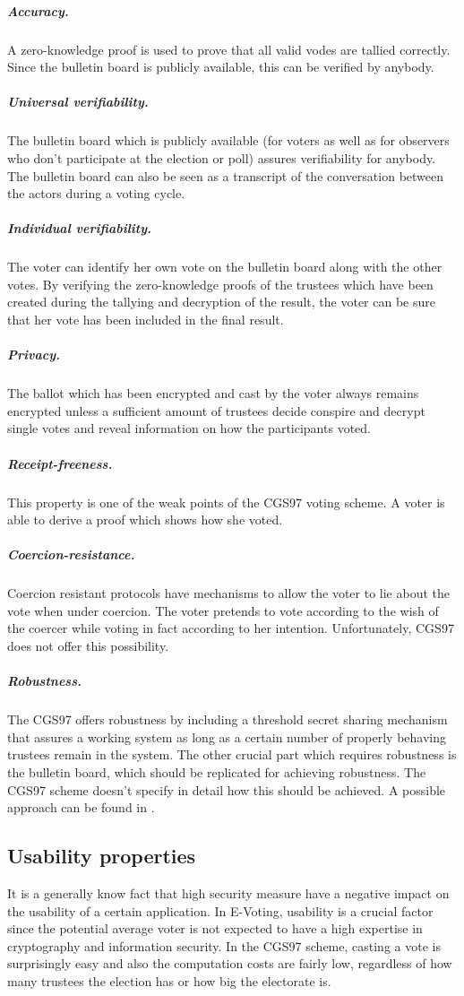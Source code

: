 \documentclass[numbers=noenddot, abstract=on, a4paper, headsepline,
footsepline, oneside, draft=off]{scrreprt}
\begin{document}
\subparagraph{Accuracy.} A zero-knowledge proof is used to prove that all valid
vodes are tallied correctly. Since the bulletin board is publicly available,
this can be verified by anybody.

\subparagraph{Universal verifiability.} The bulletin board which is publicly
available (for voters as well as for observers who don't participate at the
election or poll) assures verifiability for anybody. The bulletin board can also
be seen as a transcript of the conversation between the actors during a voting
cycle. 

\subparagraph{Individual verifiability.} The voter can identify her own vote on
the bulletin board along with the other votes. By verifying the zero-knowledge
proofs of the trustees which have been created during the tallying and
decryption of the result, the voter can be sure that her vote has been included
in the final result.

\subparagraph{Privacy.} The ballot which has been encrypted and cast by the
voter always remains encrypted unless a sufficient amount of trustees decide
conspire and decrypt single votes and reveal information on how the participants
voted.

\subparagraph{Receipt-freeness.} This property is one of the weak points of the
CGS97 voting scheme. A voter is able to derive a proof which shows how she
voted.

\subparagraph{Coercion-resistance.} Coercion resistant protocols have mechanisms
to allow the voter to lie about the vote when under coercion. The voter pretends
to vote according to the wish of the coercer while voting in fact according to
her intention. Unfortunately, CGS97 does not offer this possibility.

\subparagraph{Robustness.} The CGS97 offers robustness by including a
threshold secret sharing mechanism that assures a working system as long as a
certain number of properly behaving trustees remain in the system. The other
crucial part which requires robustness is the bulletin board, which should be
replicated for achieving robustness. The CGS97 scheme doesn't specify in detail
how this should be achieved. A possible approach can be found in \cite{HL09}.

\subsection{Usability properties}
\label{sec:usabilityproperties}
It is a generally know fact that high security measure have a negative impact on
the usability of a certain application. In E-Voting, usability is a crucial
factor since the potential average voter is not expected to have a high
expertise in cryptography and information security. In the CGS97 scheme, casting
a vote is surprisingly easy and also the computation costs are fairly low,
regardless of how many trustees the election has or how big the electorate is.
\end{document}
